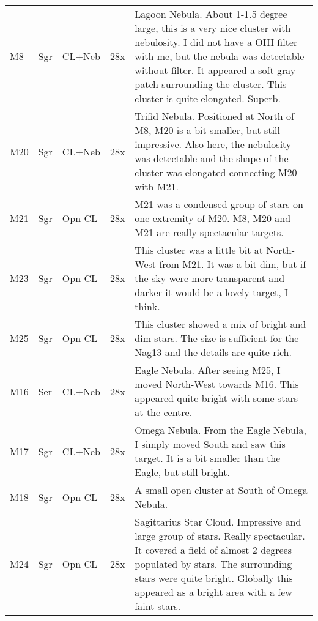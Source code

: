 \begin{longtable}{ p{0.7in}  p{0.3in}  p{0.6in}  p{0.9in}  p{5.8in} }
M8 & Sgr & CL+Neb & 28x & Lagoon Nebula. About 1-1.5 degree large, this is a very nice cluster with nebulosity. I did not have a OIII filter with me, but the nebula was detectable without filter. It appeared a soft gray patch surrounding the cluster. This cluster is quite elongated. Superb. \\ 
M20 & Sgr & CL+Neb & 28x & Trifid Nebula. Positioned at North of M8, M20 is a bit smaller, but still impressive. Also here, the nebulosity was detectable and the shape of the cluster was elongated connecting M20 with M21. \\ 
M21 & Sgr & Opn CL & 28x & M21 was a condensed group of stars on one extremity of M20. M8, M20 and M21 are really spectacular targets.   \\ 
M23 & Sgr & Opn CL & 28x & This cluster was a little bit at North-West from M21. It was a bit dim, but if the sky were more transparent and darker it would be a lovely target, I think. \\ 
M25 & Sgr & Opn CL & 28x & This cluster showed a mix of bright and dim stars. The size is sufficient for the Nag13 and the details are quite rich. \\ 
M16 & Ser & CL+Neb & 28x & Eagle Nebula. After seeing M25, I moved North-West towards M16. This appeared quite bright with some stars at the centre.  \\ 
M17 & Sgr & CL+Neb & 28x & Omega Nebula. From the Eagle Nebula, I simply moved South and saw this target. It is a bit smaller than the Eagle, but still bright.  \\ 
M18 & Sgr & Opn CL & 28x & A small open cluster at South of Omega Nebula. \\ 
M24 & Sgr & Opn CL & 28x & Sagittarius Star Cloud. Impressive and large group of stars. Really spectacular. It covered a field of almost 2 degrees populated by stars. The surrounding stars were quite bright. Globally this appeared as a bright area with a few faint stars. \\ 
\hline 
\end{longtable} 
